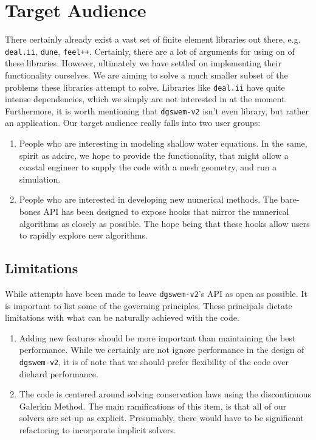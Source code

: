 \section{Target Audience}
There certainly already exist a vast set of finite element libraries out there, e.g. \texttt{deal.ii}, \texttt{dune}, \texttt{feel++}. Certainly, there are a lot of arguments for using on of these libraries. However, ultimately we have settled on implementing their functionality ourselves. We are aiming to solve a much smaller subset of the problems these libraries attempt to solve. Libraries like \texttt{deal.ii} have quite intense dependencies, which we simply are not interested in at the moment. Furthermore, it is worth mentioning that \texttt{dgswem-v2} isn't even library, but rather an application. Our target audience really falls into two user groups:
\begin{enumerate}
\item People who are interesting in modeling shallow water equations. In the same, spirit as adcirc, we hope to provide the functionality, that might allow a coastal engineer to supply the code with a mesh geometry, and run a simulation.
\item People who are interested in developing new numerical methods. The bare-bones API has been designed to expose hooks that mirror the numerical algorithms as closely as possible. The hope being that these hooks allow users to rapidly explore new algorithms.
\end{enumerate}

\subsection{Limitations}
While attempts have been made to leave \texttt{dgswem-v2}'s API as open as possible. It is important to list some of the governing principles. These principals dictate limitations with what can be naturally achieved with the code.
\begin{enumerate}
\item Adding new features should be more important than maintaining the best performance. While we certainly are not ignore performance in the design of \texttt{dgswem-v2}, it is of note that we should prefer flexibility of the code over diehard performance. 
\item The code is centered around solving conservation laws using the discontinuous Galerkin Method. The main ramifications of this item, is that all of our solvers are set-up as explicit. Presumably, there would have to be significant refactoring to incorporate implicit solvers.
\end{enumerate}

